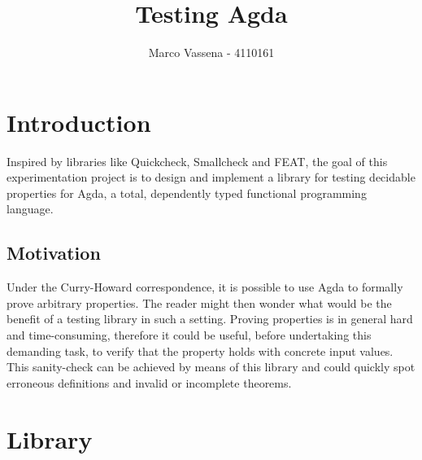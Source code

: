 \documentclass[10pt,a4paper]{article}
\author{Marco Vassena - 4110161}
\title{Testing Agda}
\begin{document}
\maketitle

\section{Introduction}
Inspired by libraries like Quickcheck, Smallcheck and FEAT, the goal of this experimentation project is to design and implement a library for testing decidable properties for Agda, a total, dependently typed functional programming language.

\subsection{Motivation}
Under the Curry-Howard correspondence, it is possible to use Agda to formally prove arbitrary properties. The reader might then wonder what would be the benefit of a testing library in such a setting. Proving properties is in general hard and time-consuming, therefore it could be useful, before undertaking this demanding task, to verify that the property holds with concrete input values. This sanity-check can be achieved by means of this library and could quickly spot erroneous definitions and invalid or incomplete theorems.

\section{Library}
\end{document}
